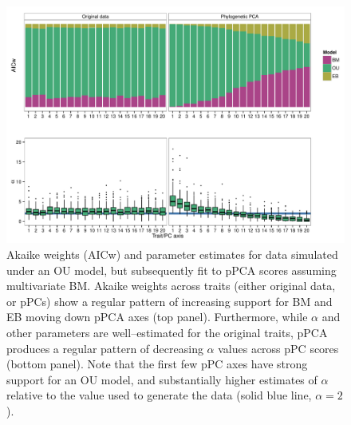 \documentclass[a4paper,12pt]{article}
\begin{document}
\begin{figure}[p]
\centering
\includegraphics[scale=0.6]{./fig/model-support-alpha.pdf}
\caption{Akaike weights (AICw) and parameter estimates for data simulated under an OU model, but subsequently fit to pPCA scores assuming multivariate BM. Akaike weights across traits (either original data, or pPCs) show a regular pattern of increasing support for BM and EB  moving down pPCA axes (top panel). Furthermore, while $\alpha$ and other parameters are well--estimated for the original traits, pPCA produces a regular pattern of decreasing $\alpha$ values across pPC scores (bottom panel). Note that the first few pPC axes have strong support for an OU model, and substantially higher estimates of $\alpha$ relative to the value used to generate the data (solid blue line, $\alpha = 2$).}
\label{oufit}
\end{figure}
\end{document}
